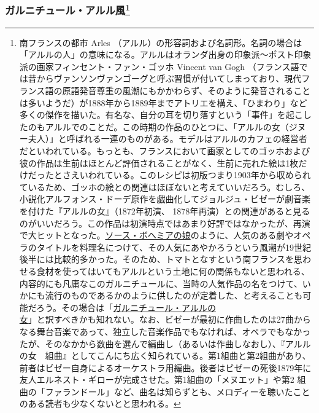 \begin{recette}
{\subsubsection[ガルニチュール・アルル風]{\texorpdfstring{ガルニチュール・アルル風\footnote{南フランスの都市
  Arles
  （アルル）の形容詞および名詞形。名詞の場合は「アルルの人」の意味になる。アルルはオランダ出身の印象派〜ポスト印象派の画家フィンセント・ファン・ゴッホ
  Vincent van Gogh
  （フランス語では昔からヴァンソンヴァンゴーグと呼ぶ習慣が付いてしまっており、現代フランス語の原語発音尊重の風潮にもかかわらず、そのように発音されることは多いようだ）が1888年から1889年までアトリエを構え、「ひまわり」など多くの傑作を描いた。有名な、自分の耳を切り落すという「事件」を起こしたのもアルルでのことだ。この時期の作品のひとつに、「アルルの女（ジヌー夫人）」と呼ばれる一連のものがある。モデルはアルルのカフェの経営者だといわれている。もっとも、フランスにおいて画家としてのゴッホおよび彼の作品は生前はほとんど評価されることがなく、生前に売れた絵は1枚だけだったとさえいわれている。このレシピは初版つまり1903年から収められているため、ゴッホの絵との関連はほぼないと考えていいだろう。むしろ、小説化アルフォンス・ドーデ原作を戯曲化してジョルジュ・ビゼーが劇音楽を付けた『アルルの女』（1872年初演、
  1878年再演）との関連があると見るのがいいだろう。この作品は初演時点ではあまり好評ではなかったが、再演で大ヒットとなった。\protect\hyperlink{sauce-bohemienne}{ソース・ボヘミアの娘}のように、人気のある劇やオペラのタイトルを料理名につけて、その人気にあやかろうという風潮が19世紀後半には比較的多かった。そのため、トマトとなすという南フランスを思わせる食材を使ってはいてもアルルという土地に何の関係もないと思われる、内容的にも凡庸なこのガルニチュールに、当時の人気作品の名をつけて、いかにも流行のものであるかのように供したのが定着した、と考えることも可能だろう。その場合は「\ul{ガルニチュール・アルルの\\女}」と訳すべきかも知れない。なお、ビゼーが最初に作曲したのは27曲からなる舞台音楽であって、独立した音楽作品でもなければ、オペラでもなかったが、そのなかから数曲を選んで編曲し（あるいは作曲しなおし）、『アルルの女　組曲』としてこんにち広く知られている。第1組曲と第2組曲があり、前者はビゼー自身によるオーケストラ用編曲。後者はビゼーの死後1879年に友人エルネスト・ギローが完成させた。第1組曲の「メヌエット」や第2
  組曲の「ファランドール」など、曲名は知らずとも、メロディーを聴いたことのある読者も少なくないとと思われる。}}{ガルニチュール・アルル風}}\label{garniture-arlesienne}}




\end{recette}
